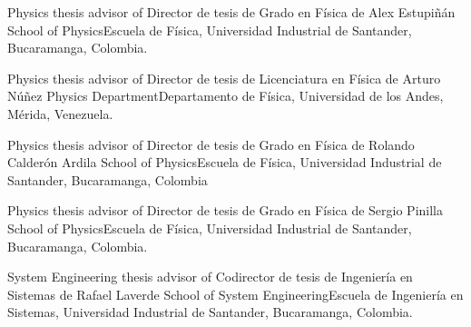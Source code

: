 \ifeng
Physics thesis advisor of
\else
Director de tesis de Grado en Física de
\fi
Alex Estupiñán \at \ifeng School of Physics\else Escuela de Física\fi, Universidad Industrial de Santander, Bucaramanga, Colombia.

\ifeng
Physics thesis advisor of
\else
Director de tesis de Licenciatura en Física de
\fi
Arturo Núñez \at \ifeng Physics Department\else Departamento de Física\fi, Universidad de los Andes, Mérida, Venezuela. 

\ifeng
Physics thesis advisor of
\else
Director de tesis de Grado en Física de
\fi
Rolando Calderón Ardila \at  \ifeng School of Physics\else Escuela de Física\fi, Universidad Industrial de Santander, Bucaramanga, Colombia 

\ifeng
Physics thesis advisor of
\else
Director de tesis de Grado en Física de
\fi
Sergio Pinilla \at \ifeng School of Physics\else Escuela de Física\fi, Universidad Industrial de Santander, Bucaramanga, Colombia.

\ifeng
System Engineering thesis advisor of
\else
Codirector de tesis de Ingeniería en Sistemas de
\fi
Rafael Laverde \at \ifeng School of System Engineering\else Escuela de Ingeniería en Sistemas\fi, Universidad Industrial de Santander, Bucaramanga, Colombia.
